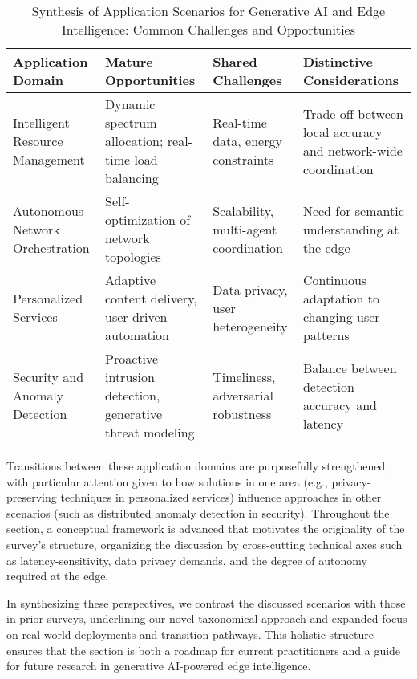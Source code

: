 \documentclass[sigconf]{acmart}
\begin{document}
\begin{table*}[htbp]
\centering
\caption{Synthesis of Application Scenarios for Generative AI and Edge Intelligence: Common Challenges and Opportunities}
\label{tab:app_scenarios}
\begin{adjustbox}{max width=\textwidth}
\begin{tabular}{@{}llll@{}}
\toprule
Application Domain & Mature Opportunities & Shared Challenges & Distinctive Considerations \\
\midrule
Intelligent Resource Management & Dynamic spectrum allocation; real-time load balancing & Real-time data, energy constraints & Trade-off between local accuracy and network-wide coordination \\
Autonomous Network Orchestration & Self-optimization of network topologies & Scalability, multi-agent coordination & Need for semantic understanding at the edge \\
Personalized Services & Adaptive content delivery, user-driven automation & Data privacy, user heterogeneity & Continuous adaptation to changing user patterns \\
Security and Anomaly Detection & Proactive intrusion detection, generative threat modeling & Timeliness, adversarial robustness & Balance between detection accuracy and latency \\
\bottomrule
\end{tabular}
\end{adjustbox}
\end{table*}

Transitions between these application domains are purposefully strengthened, with particular attention given to how solutions in one area (e.g., privacy-preserving techniques in personalized services) influence approaches in other scenarios (such as distributed anomaly detection in security). Throughout the section, a conceptual framework is advanced that motivates the originality of the survey’s structure, organizing the discussion by cross-cutting technical axes such as latency-sensitivity, data privacy demands, and the degree of autonomy required at the edge.

In synthesizing these perspectives, we contrast the discussed scenarios with those in prior surveys, underlining our novel taxonomical approach and expanded focus on real-world deployments and transition pathways. This holistic structure ensures that the section is both a roadmap for current practitioners and a guide for future research in generative AI-powered edge intelligence.
\end{document}

